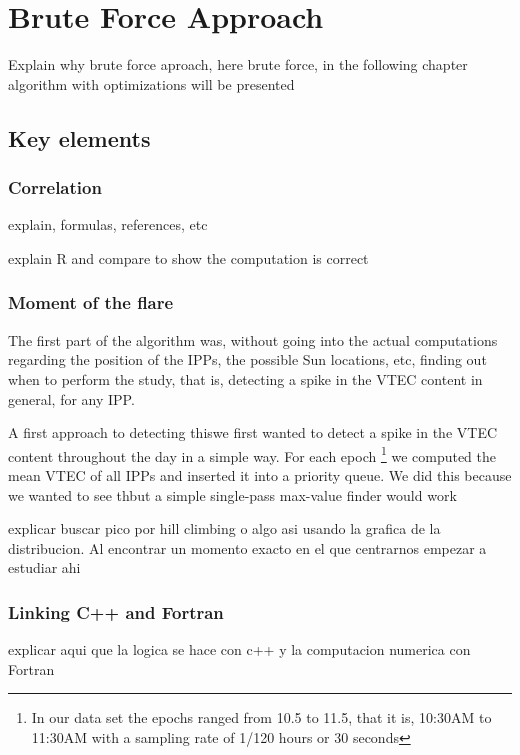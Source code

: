 \chapter{Brute Force Approach}

Explain why brute force aproach, here brute force, in the following chapter algorithm with optimizations will be presented

\section{Key elements}

\subsection{Correlation}

explain, formulas, references, etc

explain R and compare to show the computation is correct

\subsection{Moment of the flare}

The first part of the algorithm was, without going into the actual computations regarding the position of the IPPs, the possible Sun locations, etc, finding out when to perform the study, that is, detecting a spike in the VTEC content in general, for any IPP.

A first approach to detecting thiswe first wanted to detect a spike in the VTEC content throughout the day in a simple way. For each epoch \footnote{In our data set the epochs ranged from 10.5 to 11.5, that it is, 10:30AM to 11:30AM with a sampling rate of 1/120 hours or 30 seconds} we computed the mean VTEC of all IPPs and inserted it into a priority queue. We did this because we wanted to see thbut a simple single-pass max-value finder would work

explicar buscar pico por hill climbing o algo asi usando la grafica de la distribucion. Al encontrar un momento exacto en el que centrarnos empezar a estudiar ahi

\subsection{Linking C++ and Fortran}

explicar aqui que la logica se hace con c++ y la computacion numerica con Fortran

